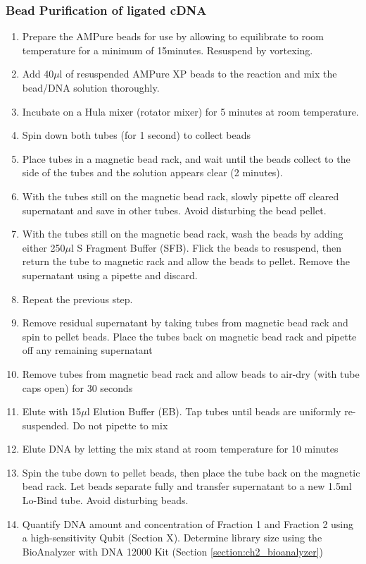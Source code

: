 \subsubsection{Bead Purification of ligated cDNA}
\begin{enumerate}
	\item Prepare the AMPure beads for use by allowing to equilibrate to room temperature for a minimum of 15minutes. Resuspend by vortexing.
	\item Add 40$\mu$l of resuspended AMPure XP beads to the reaction and mix the bead/DNA solution thoroughly.
	\item Incubate on a Hula mixer (rotator mixer) for 5 minutes at room temperature.
	\item Spin down both tubes (for 1 second) to collect beads 
	\item Place tubes in a magnetic bead rack, and wait until the beads collect to the side of the tubes and the solution appears clear (2 minutes).
	\item With the tubes still on the magnetic bead rack, slowly pipette off cleared supernatant and save in other tubes. Avoid disturbing the bead pellet.
	\item With the tubes still on the magnetic bead rack, wash the beads by adding either 250$\mu$l S Fragment Buffer (SFB). Flick the beads to resuspend, then return the tube to magnetic rack and allow the beads to pellet. Remove the supernatant using a pipette and discard.
	\item Repeat the previous step.
	\item Remove residual supernatant by taking tubes from magnetic bead rack and spin to pellet beads. Place the tubes back on magnetic bead rack and pipette off any remaining supernatant 
	\item Remove tubes from magnetic bead rack and allow beads to air-dry (with tube caps open) for 30 seconds
	\item Elute with 15$\mu$l Elution Buffer (EB). Tap tubes until beads are uniformly re-suspended. Do not pipette to mix
	\item Elute DNA by letting the mix stand at room temperature for 10 minutes 
	\item Spin the tube down to pellet beads, then place the tube back on the magnetic bead rack. Let beads separate fully and transfer supernatant to a new 1.5ml Lo-Bind tube. Avoid disturbing beads.
	\item Quantify DNA amount and concentration of Fraction 1 and Fraction 2 using a high-sensitivity Qubit (Section X). Determine library size using the BioAnalyzer with DNA 12000 Kit (Section \ref{section:ch2_bioanalyzer}) 
\end{enumerate}

